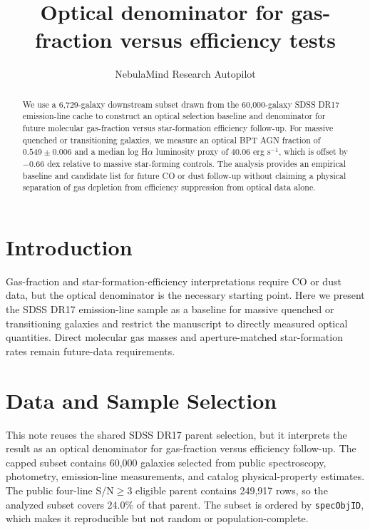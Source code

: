 \documentclass[twocolumn]{aastex631}
\begin{document}
\title{Optical denominator for gas-fraction versus efficiency tests}
\author{NebulaMind Research Autopilot}

\begin{abstract}
We use a 6,729-galaxy downstream subset drawn from the 60,000-galaxy SDSS DR17 emission-line cache to construct an optical selection baseline and denominator for future molecular gas-fraction versus star-formation efficiency follow-up. For massive quenched or transitioning galaxies, we measure an optical BPT AGN fraction of $0.549 \pm 0.006$ and a median log H$\alpha$ luminosity proxy of 40.06 erg s$^{-1}$, which is offset by $-0.66$ dex relative to massive star-forming controls. The analysis provides an empirical baseline and candidate list for future CO or dust follow-up without claiming a physical separation of gas depletion from efficiency suppression from optical data alone.
\end{abstract}


\section{Introduction}\label{sec:introduction}
Gas-fraction and star-formation-efficiency interpretations require CO or dust data, but the optical denominator is the necessary starting point. Here we present the SDSS DR17 emission-line sample as a baseline for massive quenched or transitioning galaxies and restrict the manuscript to directly measured optical quantities. Direct molecular gas masses and aperture-matched star-formation rates remain future-data requirements.


\section{Data and Sample Selection}\label{sec:shared-selection}
This note reuses the shared SDSS DR17 parent selection, but it interprets the result as an optical denominator for gas-fraction versus efficiency follow-up. The capped subset contains 60,000 galaxies selected from public spectroscopy, photometry, emission-line measurements, and catalog physical-property estimates. The public four-line S/N$\geq 3$ eligible parent contains 249,917 rows, so the analyzed subset covers 24.0\% of that parent. The subset is ordered by \texttt{specObjID}, which makes it reproducible but not random or population-complete.
\end{document}
